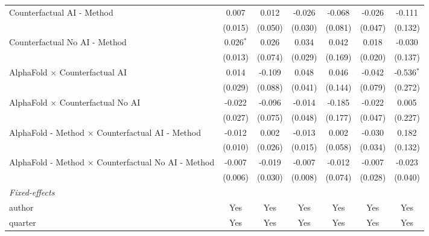 \begin{tabular}{lcccccc}
   Counterfactual AI - Method                                 & 0.007         & 0.012   & -0.026        & -0.068       & -0.026  & -0.111\\   
                                                              & (0.015)       & (0.050) & (0.030)       & (0.081)      & (0.047) & (0.132)\\   
   Counterfactual No AI - Method                              & 0.026$^{*}$   & 0.026   & 0.034         & 0.042        & 0.018   & -0.030\\   
                                                              & (0.013)       & (0.074) & (0.029)       & (0.169)      & (0.020) & (0.137)\\   
   AlphaFold $\times$ Counterfactual AI                       & 0.014         & -0.109  & 0.048         & 0.046        & -0.042  & -0.536$^{*}$\\   
                                                              & (0.029)       & (0.088) & (0.041)       & (0.144)      & (0.079) & (0.272)\\   
   AlphaFold $\times$ Counterfactual No AI                    & -0.022        & -0.096  & -0.014        & -0.185       & -0.022  & 0.005\\   
                                                              & (0.027)       & (0.075) & (0.048)       & (0.177)      & (0.047) & (0.227)\\   
   AlphaFold - Method $\times$ Counterfactual AI - Method     & -0.012        & 0.002   & -0.013        & 0.002        & -0.030  & 0.182\\   
                                                              & (0.010)       & (0.026) & (0.015)       & (0.058)      & (0.034) & (0.132)\\   
   AlphaFold - Method $\times$ Counterfactual No AI - Method  & -0.007        & -0.019  & -0.007        & -0.012       & -0.007  & -0.023\\   
                                                              & (0.006)       & (0.030) & (0.008)       & (0.074)      & (0.028) & (0.040)\\   
   \midrule
   \emph{Fixed-effects}\\
   author                                                     & Yes           & Yes     & Yes           & Yes          & Yes     & Yes\\  
   quarter                                                    & Yes           & Yes     & Yes           & Yes          & Yes     & Yes\\  

\end{tabular}
